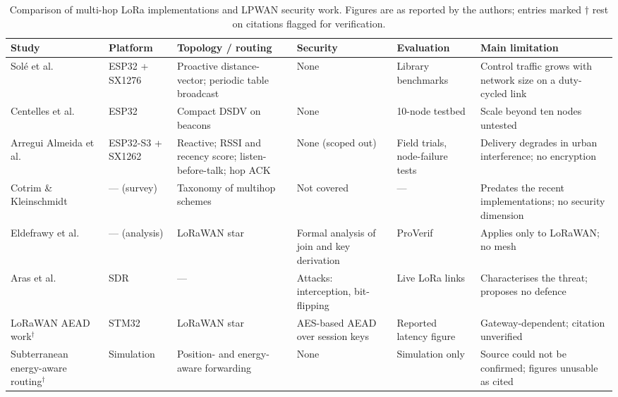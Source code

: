 \documentclass[conference]{IEEEtran}
\begin{document}
\begin{table}[!t]
\caption{Comparison of multi-hop LoRa implementations and LPWAN security work.
Figures are as reported by the authors; entries marked $\dagger$ rest on
citations flagged for verification.}
\label{tab:compare}
\centering
\footnotesize
\begin{tabular}{@{}p{2.5cm} p{1.5cm} p{2.6cm} p{2.9cm} p{2.4cm} p{3.4cm}@{}}
\toprule
\textbf{Study} & \textbf{Platform} & \textbf{Topology / routing} &
\textbf{Security} & \textbf{Evaluation} & \textbf{Main limitation} \\
\midrule

Solé et al.~\cite{sole2022loramesher} &
ESP32 + SX1276 &
Proactive distance-vector; periodic table broadcast &
None &
Library benchmarks &
Control traffic grows with network size on a duty-cycled link \\

Centelles et al.~\cite{centelles2024dsdv} &
ESP32 &
Compact DSDV on beacons &
None &
10-node testbed &
Scale beyond ten nodes untested \\

Arregui Almeida et al.~\cite{arregui2025gatewayfree} &
ESP32-S3 + SX1262 &
Reactive; RSSI and recency score; listen-before-talk; hop ACK &
None (scoped out) &
Field trials, node-failure tests &
Delivery degrades in urban interference; no encryption \\

Cotrim \& Kleinschmidt~\cite{cotrim2020lorawan} &
--- (survey) &
Taxonomy of multihop schemes &
Not covered &
--- &
Predates the recent implementations; no security dimension \\

Eldefrawy et al.~\cite{eldefrawy2019formal} &
--- (analysis) &
LoRaWAN star &
Formal analysis of join and key derivation &
ProVerif &
Applies only to LoRaWAN; no mesh \\

Aras et al.~\cite{aras2017exploring} &
SDR &
--- &
Attacks: interception, bit-flipping &
Live LoRa links &
Characterises the threat; proposes no defence \\

LoRaWAN AEAD work$^\dagger$ &
STM32 &
LoRaWAN star &
AES-based AEAD over session keys &
Reported latency figure &
Gateway-dependent; citation unverified \\

Subterranean energy-aware routing$^\dagger$ &
Simulation &
Position- and energy-aware forwarding &
None &
Simulation only &
Source could not be confirmed; figures unusable as cited \\

\bottomrule
\end{tabular}
\end{table}
\end{document}
